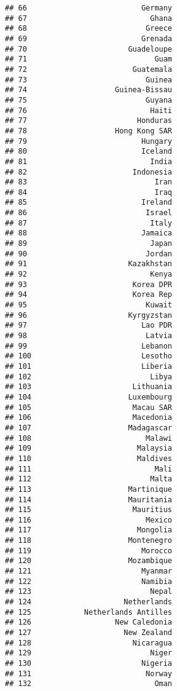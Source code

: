 \documentclass[]{article}
\begin{document}
\begin{verbatim}
## 66                          Germany
## 67                            Ghana
## 68                           Greece
## 69                          Grenada
## 70                       Guadeloupe
## 71                             Guam
## 72                        Guatemala
## 73                           Guinea
## 74                    Guinea-Bissau
## 75                           Guyana
## 76                            Haiti
## 77                         Honduras
## 78                    Hong Kong SAR
## 79                          Hungary
## 80                          Iceland
## 81                            India
## 82                        Indonesia
## 83                             Iran
## 84                             Iraq
## 85                          Ireland
## 86                           Israel
## 87                            Italy
## 88                          Jamaica
## 89                            Japan
## 90                           Jordan
## 91                       Kazakhstan
## 92                            Kenya
## 93                        Korea DPR
## 94                        Korea Rep
## 95                           Kuwait
## 96                       Kyrgyzstan
## 97                          Lao PDR
## 98                           Latvia
## 99                          Lebanon
## 100                         Lesotho
## 101                         Liberia
## 102                           Libya
## 103                       Lithuania
## 104                      Luxembourg
## 105                       Macau SAR
## 106                       Macedonia
## 107                      Madagascar
## 108                          Malawi
## 109                        Malaysia
## 110                        Maldives
## 111                            Mali
## 112                           Malta
## 113                      Martinique
## 114                      Mauritania
## 115                       Mauritius
## 116                          Mexico
## 117                        Mongolia
## 118                      Montenegro
## 119                         Morocco
## 120                      Mozambique
## 121                         Myanmar
## 122                         Namibia
## 123                           Nepal
## 124                     Netherlands
## 125            Netherlands Antilles
## 126                   New Caledonia
## 127                     New Zealand
## 128                       Nicaragua
## 129                           Niger
## 130                         Nigeria
## 131                          Norway
## 132                            Oman

\end{verbatim}
\end{document}
